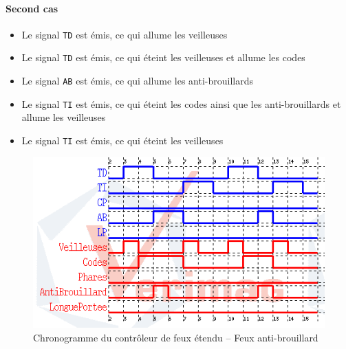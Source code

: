 \documentclass{article}
\begin{document}
      \paragraph{Second cas}
        \begin{itemize}
          \item Le signal {\tt TD} est émis, ce qui allume les veilleuses
          \item Le signal {\tt TD} est émis, ce qui éteint les veilleuses et
            allume les codes
          \item Le signal {\tt AB} est émis, ce qui allume les anti-brouillards
          \item Le signal {\tt TI} est émis, ce qui éteint les codes ainsi que
            les anti-brouillards et allume les veilleuses
          \item Le signal {\tt TI} est émis, ce qui éteint les veilleuses
        \end{itemize}

      \begin{figure}
        \centering
        \includegraphics[scale=0.5]{img/chrono1_feux-ext.png}
        \caption{Chronogramme du contrôleur de feux étendu -- Feux anti-brouillard}
        \label{fig:chrono1_feux-ext}
      \end{figure}
\end{document}
